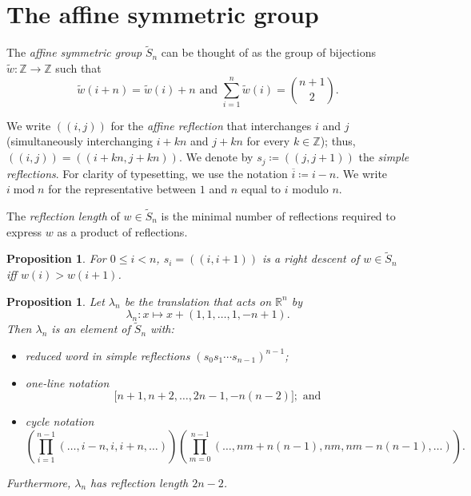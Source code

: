 \documentclass[a4paper,10pt,leqno]{amsart}
\newcommand{\darkred}{\color{darkred}}
\numberwithin{equation}{section}
\newtheorem{proposition}[theorem]{Proposition}
\theoremstyle{definition}
\theoremstyle{remark}
\newcommand{\AS}{\widetilde{S}}
\newcommand{\ww}{\widetilde{w}}
\renewcommand{\mod}{\;\mathrm{mod}\;}
\newcommand{\defn}[1]{\emph{\darkred #1}}
\begin{document}
\section{The affine symmetric group}
\label{sec:affine_symmetric}

The \defn{affine symmetric group} $\AS_{n}$ can be thought of as the group of bijections $\ww: \mathbb{Z} \to \mathbb{Z}$ such that~\cite[Chapter 8]{bjorner2005combinatorics}
\begin{equation}
\ww(i+n)=\ww(i)+n \text{ and } \sum_{i=1}^n \ww(i) = \binom{n+1}{2}.
\end{equation}

We write $(\!(i,j)\!)$ for the \defn{affine reflection} that interchanges $i$ and $j$ (simultaneously interchanging $i+kn$ and $j+kn$ for every $k \in \mathbb{Z}$); thus, $(\!(i,j)\!)=(\!(i+kn,j+kn)\!)$. We denote by $s_j \coloneqq (\!(j, j+1 )\!)$ the \defn{simple reflections}. For clarity of typesetting, we use the notation $\overline{i}\coloneqq i-n$.  We write $i \mod n$ for the representative between $1$ and $n$ equal to $i$ modulo $n$.

The \defn{reflection length} of $w \in \AS_n$ is the minimal number of reflections required to express $w$ as a product of reflections.

\begin{proposition}
\label{prop:descents}
For $0 \leq i < n$, $s_i=(\!(i,i+1)\!)$ is a right descent of $w\in \AS_n$ iff $w(i)>w(i+1)$.
\end{proposition}

\begin{proposition}
\label{eq:cycle}
  Let $\lambda_n$ be the translation that acts on $\mathbb{R}^n$ by \[\lambda_n: x \mapsto x+(1,1,\ldots,1,-n+1).\]Then $\lambda_n$ is an element of $\AS_n$ with:
  \begin{itemize}
    \item reduced word in simple reflections
      $(s_0s_1 \cdots s_{n-1})^{n-1}$;
    \item one-line notation
      \[\big[n+1,n+2,\ldots,2n-1,-n(n-2)\big]; \text{ and}\]
    \item cycle notation
      \begin{equation*}
        \left(\prod_{i=1}^{n-1}\left(\ldots,i-n,i,i+n,\ldots\right)\right)\left(\prod_{m=0}^{n-1} \left(\ldots,nm+n(n-1),nm,nm-n(n-1),\ldots\right)\right).
      \end{equation*}
  \end{itemize}
  Furthermore, $\lambda_n$ has reflection length $2n-2$.
\end{proposition}
\end{document}

